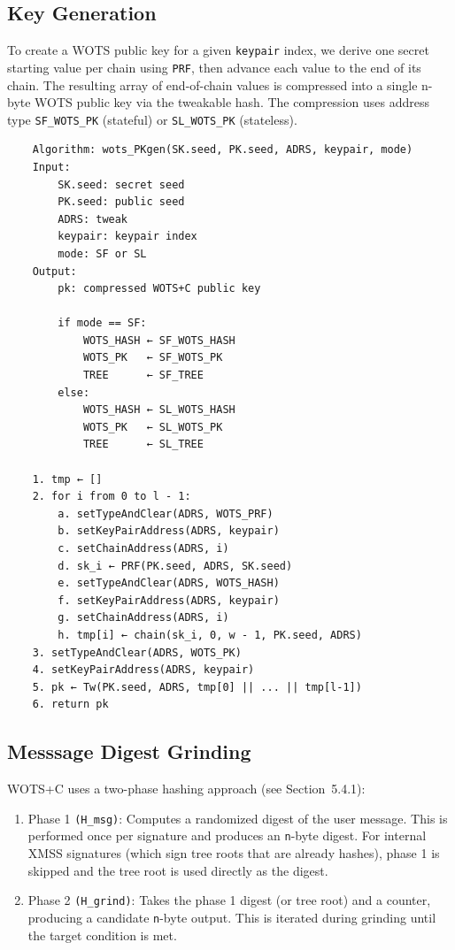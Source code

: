 \subsection{Key Generation}
To create a WOTS public key for a given \texttt{keypair} index, we derive one secret starting value per chain using \texttt{PRF}, then advance each value to the end of its chain. The resulting array of end-of-chain values is compressed into a single n-byte WOTS public key via the tweakable hash. The compression uses address type \texttt{SF\_WOTS\_PK} (stateful) or \texttt{SL\_WOTS\_PK} (stateless).
\begin{verbatim}
    Algorithm: wots_PKgen(SK.seed, PK.seed, ADRS, keypair, mode)
    Input:
        SK.seed: secret seed
        PK.seed: public seed
        ADRS: tweak
        keypair: keypair index
        mode: SF or SL
    Output:
        pk: compressed WOTS+C public key

        if mode == SF: 
            WOTS_HASH ← SF_WOTS_HASH
            WOTS_PK   ← SF_WOTS_PK
            TREE      ← SF_TREE 
        else:
            WOTS_HASH ← SL_WOTS_HASH
            WOTS_PK   ← SL_WOTS_PK
            TREE      ← SL_TREE

    1. tmp ← []
    2. for i from 0 to l - 1:
        a. setTypeAndClear(ADRS, WOTS_PRF)
        b. setKeyPairAddress(ADRS, keypair)
        c. setChainAddress(ADRS, i)
        d. sk_i ← PRF(PK.seed, ADRS, SK.seed)
        e. setTypeAndClear(ADRS, WOTS_HASH)
        f. setKeyPairAddress(ADRS, keypair)
        g. setChainAddress(ADRS, i)
        h. tmp[i] ← chain(sk_i, 0, w - 1, PK.seed, ADRS)
    3. setTypeAndClear(ADRS, WOTS_PK)
    4. setKeyPairAddress(ADRS, keypair)
    5. pk ← Tw(PK.seed, ADRS, tmp[0] || ... || tmp[l-1])
    6. return pk
\end{verbatim}

\subsection{Messsage Digest Grinding}
WOTS+C uses a two-phase hashing approach (see Section~5.4.1):
\begin{enumerate}
    \item Phase 1 \texttt{(H\_msg)}: Computes a randomized digest of the user message. This is performed once per signature and produces an \texttt{n}-byte digest. For internal XMSS signatures (which sign tree roots that are already hashes), phase 1 is skipped and the tree root is used directly as the digest.
    \item Phase 2 \texttt{(H\_grind)}: Takes the phase 1 digest (or tree root) and a counter, producing a candidate \texttt{n}-byte output. This is iterated during grinding until the target condition is met.
\end{enumerate}


